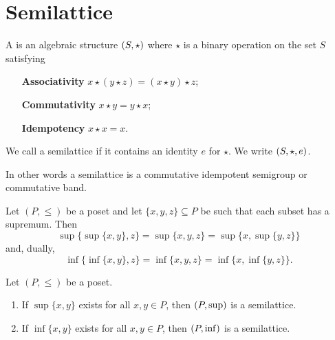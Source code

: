 \chapter{Semilattice}
\begin{definition}
A  is an algebraic structure $\sSet{S,\star}$ where $\star$ is a binary operation on the set $S$ satisfying
\begin{itemize}[leftmargin=2.5cm]
\item[\textbf{Associativity}] $x\star (y\star z) = (x\star y) \star z$;
\item[\textbf{Commutativity}] $x \star y = y \star x$;
\item[\textbf{Idempotency}] $x\star x = x$.
\end{itemize}
We call a semilattice  if it contains an identity $e$ for $\star$. We write $\sSet{S, \star, e}$.
\end{definition}
In other words a semilattice is a commutative idempotent semigroup or commutative band.

\begin{lemma}
Let $(P,\leq)$ be a poset and let $\{x,y,z\}\subseteq P$ be such that each subset has a supremum. Then
\[ \sup\{\sup\{x,y\},z\} = \sup\{x,y,z\} = \sup\{x,\sup\{y,z\}\} \]
and, dually,
\[ \inf\{\inf\{x,y\},z\} = \inf\{x,y,z\} = \inf\{x,\inf\{y,z\}\}. \]
\end{lemma}
\begin{corollary}
Let $(P,\leq)$ be a poset.
\begin{enumerate}
\item If $\sup\{x,y\}$ exists for all $x,y\in P$, then $\sSet{P,\sup}$ is a semilattice.
\item If $\inf\{x,y\}$ exists for all $x,y\in P$, then $\sSet{P,\inf}$ is a semilattice.
\end{enumerate}
\end{corollary}

